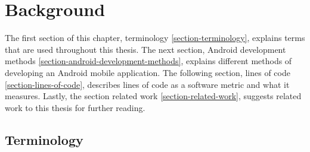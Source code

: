 \chapter{Background}\label{ch:background}
The first section of this chapter, terminology \ref{section-terminology}, explains terms that are used throughout this thesis. The next section, Android development methods \ref{section-android-development-methods}, explains different methods of developing an Android mobile application. The following section, lines of code \ref{section-lines-of-code}, describes lines of code as a software metric and what it measures. Lastly, the section related work \ref{section-related-work}, suggests related work to this thesis for further reading. 

\section{Terminology}\label{sec:terminology}
